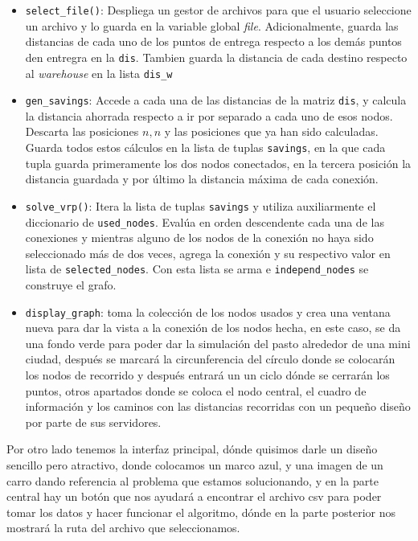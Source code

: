 \documentclass[10pt,twocolumn,letterpaper]{article}
\begin{document}
\begin{itemize}
	\item \texttt{select\_file()}: Despliega un gestor de archivos para que el usuario seleccione un archivo y lo guarda en la variable global \textit{file}. Adicionalmente, guarda las distancias de cada uno de los puntos de entrega respecto a los demás puntos den entregra en la \texttt{dis}. Tambien guarda la distancia de cada destino respecto al \textit{warehouse} en la lista \texttt{dis\_w}
	\item \texttt{gen\_savings}: Accede a cada una de las distancias de la matriz \texttt{dis}, y calcula la distancia ahorrada respecto a ir por separado a cada uno de esos nodos. Descarta las posiciones $n, n$ y las posiciones que ya han sido calculadas. Guarda todos estos cálculos en la lista de tuplas \texttt{savings}, en la que cada tupla guarda primeramente los dos nodos conectados, en la tercera posición la distancia guardada y por último la distancia máxima de cada conexión.
	\item \texttt{solve\_vrp()}: Itera la lista de tuplas \texttt{savings} y utiliza auxiliarmente el diccionario de \texttt{used\_nodes}. Evalúa en orden descendente cada una de las conexiones y mientras alguno de los nodos de la conexión no haya sido seleccionado más de dos veces, agrega la conexión y su respectivo valor en lista de \texttt{selected\_nodes}. Con esta lista se arma e \texttt{independ\_nodes} se construye el grafo.
	\item \texttt{display\_graph}: toma la colección de los nodos usados  y crea una ventana nueva para dar la vista a la conexión de los nodos hecha, en este caso, se da una fondo verde para poder dar la simulación del pasto alrededor de una mini ciudad, después se marcará la circunferencia del círculo donde se colocarán los nodos de recorrido y después entrará un un ciclo dónde se cerrarán los puntos, otros apartados donde se coloca el nodo central, el cuadro de información y los caminos con las distancias recorridas con un pequeño diseño por parte de sus servidores.
\end{itemize}

Por otro lado tenemos la interfaz principal, dónde quisimos darle un diseño sencillo pero atractivo, donde colocamos un marco azul, y una imagen de un carro dando referencia al problema que estamos solucionando, y en la parte central hay un botón que nos ayudará a encontrar el archivo csv para poder tomar los datos y hacer funcionar el algoritmo, dónde en la parte posterior nos mostrará la ruta del archivo que seleccionamos.
\end{document}
